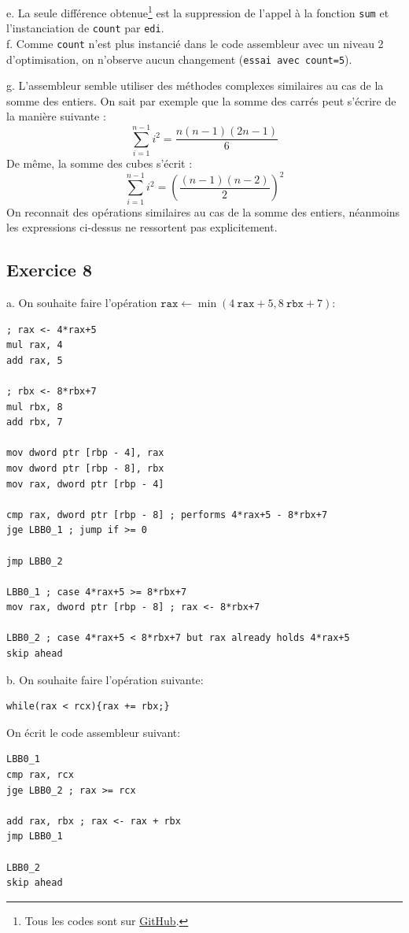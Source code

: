\documentclass[11pt, a4 paper]{article}
\begin{document}
e. La seule différence obtenue\footnote{Tous les codes sont sur \href{https://github.com/VTrelat/ComputerArchitecture/tree/main/c}{GitHub}.} est la suppression de l'appel à la fonction \texttt{sum} et l'instanciation de \texttt{count} par \texttt{edi}.\\

f. Comme \texttt{count} n'est plus instancié dans le code assembleur avec un niveau 2 d'optimisation, on n'observe aucun changement (\texttt{essai avec \texttt{count=5}}).

g. L'assembleur semble utiliser des méthodes complexes similaires au cas de la somme des entiers. On sait par exemple que la somme des carrés peut s'écrire de la manière suivante :
\begin{equation*}
    \sum_{i=1}^{n-1} i^2 = \frac{n(n-1)(2n-1)}{6}
\end{equation*}
De même, la somme des cubes s'écrit :
\begin{equation*}
    \sum_{i=1}^{n-1} i^2 = (\frac{(n-1)(n-2)}{2})^2
\end{equation*}
On reconnait des opérations similaires au cas de la somme des entiers, néanmoins les expressions ci-dessus ne ressortent pas explicitement.\\

\subsection{Exercice 8}

a. On souhaite faire l'opération $\texttt{rax} \leftarrow \min(4~\texttt{rax}+5, 8~\texttt{rbx}+7)$:
\begin{lstlisting}[style=customasm]
; rax <- 4*rax+5
mul rax, 4
add rax, 5

; rbx <- 8*rbx+7
mul rbx, 8
add rbx, 7

mov dword ptr [rbp - 4], rax
mov dword ptr [rbp - 8], rbx
mov rax, dword ptr [rbp - 4]

cmp rax, dword ptr [rbp - 8] ; performs 4*rax+5 - 8*rbx+7
jge LBB0_1 ; jump if >= 0

jmp LBB0_2

LBB0_1 ; case 4*rax+5 >= 8*rbx+7
mov rax, dword ptr [rbp - 8] ; rax <- 8*rbx+7

LBB0_2 ; case 4*rax+5 < 8*rbx+7 but rax already holds 4*rax+5
skip ahead
\end{lstlisting}

b. On souhaite faire l'opération suivante:\\
\begin{lstlisting}[style=CStyle]
while(rax < rcx){rax += rbx;}
\end{lstlisting}
On écrit le code assembleur suivant:\\
\begin{lstlisting}[style=customasm]
LBB0_1
cmp rax, rcx
jge LBB0_2 ; rax >= rcx

add rax, rbx ; rax <- rax + rbx
jmp LBB0_1

LBB0_2
skip ahead
\end{lstlisting}
\end{document}

